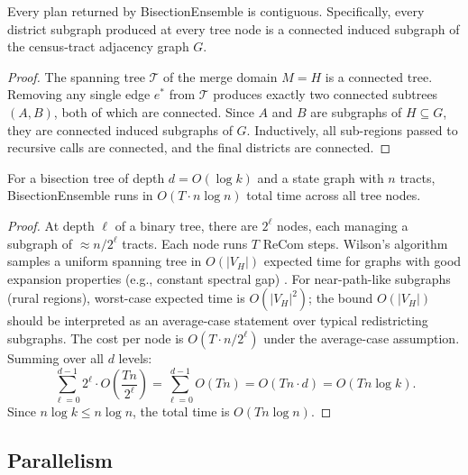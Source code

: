 \begin{proposition}
  \label{prop:contiguity}
  Every plan returned by BisectionEnsemble is contiguous. Specifically, every
  district subgraph produced at every tree node is a connected induced subgraph
  of the census-tract adjacency graph $G$.
\end{proposition}

\begin{proof}
  The spanning tree $\mathcal{T}$ of the merge domain $M = H$ is a connected tree.
  Removing any single edge $e^*$ from $\mathcal{T}$ produces exactly two
  connected subtrees $(A, B)$, both of which are connected. Since $A$ and $B$
  are subgraphs of $H \subseteq G$, they are connected induced subgraphs of $G$.
  Inductively, all sub-regions passed to recursive calls are connected, and the
  final districts are connected.
\end{proof}

\begin{proposition}[Complexity]
  \label{prop:complexity}
  For a bisection tree of depth $d = O(\log k)$ and a state graph with $n$ tracts,
  BisectionEnsemble runs in $O(T \cdot n \log n)$ total time across all tree nodes.
\end{proposition}

\begin{proof}
  At depth $\ell$ of a binary tree, there are $2^\ell$ nodes, each managing a
  subgraph of $\approx n / 2^\ell$ tracts. Each node runs $T$ ReCom steps.
  Wilson's algorithm samples a uniform spanning tree in $O(|V_H|)$ expected
  time for graphs with good expansion properties (e.g., constant spectral gap)
  \citep{wilson1996generating}. For near-path-like subgraphs (rural regions),
  worst-case expected time is $O(|V_H|^2)$; the bound $O(|V_H|)$ should be
  interpreted as an average-case statement over typical redistricting subgraphs.
  The cost per node is $O(T \cdot n / 2^\ell)$ under the average-case assumption.
  Summing over all $d$ levels:
  \[
    \sum_{\ell=0}^{d-1} 2^\ell \cdot O\!\left(\frac{Tn}{2^\ell}\right)
    = \sum_{\ell=0}^{d-1} O(Tn)
    = O(Tn \cdot d)
    = O(Tn \log k).
  \]
  Since $n \log k \leq n \log n$, the total time is $O(T n \log n)$.
\end{proof}

\subsection{Parallelism}
\label{sec:alg:parallel}

